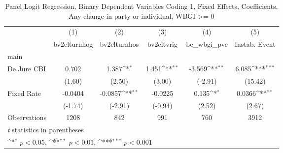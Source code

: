 \begin{table}[htbp]\centering
\def\sym#1{\ifmmode^{#1}\else\(^{#1}\)\fi}
\caption{Panel Logit Regression, Binary Dependent Variables Coding 1, Fixed Effects, Coefficients, Any change in party or individual, WBGI >= 0 \label{logitFEMultIndDJ}}
\begin{tabular}{l*{5}{c}}
\toprule
                                        &\multicolumn{1}{c}{(1)}&\multicolumn{1}{c}{(2)}&\multicolumn{1}{c}{(3)}&\multicolumn{1}{c}{(4)}&\multicolumn{1}{c}{(5)}\\
                                        &\multicolumn{1}{c}{bv2elturnhog}&\multicolumn{1}{c}{bv2elturnhos}&\multicolumn{1}{c}{bv2eltvrig}&\multicolumn{1}{c}{be\_wbgi\_pve}&\multicolumn{1}{c}{Instab. Event}\\
\midrule
main                                    &                  &                  &                  &                  &                  \\
De Jure CBI                             &    0.702         &    1.387\sym{*}  &    1.451\sym{**} &   -3.569\sym{**} &    6.085\sym{***}\\
                                        &   (1.60)         &   (2.50)         &   (3.00)         &  (-2.91)         &  (15.42)         \\
\addlinespace
Fixed Rate                              &  -0.0404         &  -0.0857\sym{**} &  -0.0225         &    0.135\sym{*}  &   0.0366\sym{**} \\
                                        &  (-1.74)         &  (-2.91)         &  (-0.94)         &   (2.52)         &   (2.67)         \\
\midrule
Observations                            &     1208         &      842         &      991         &      760         &     3912         \\
\bottomrule
\multicolumn{6}{l}{\footnotesize \textit{t} statistics in parentheses}\\
\multicolumn{6}{l}{\footnotesize \sym{*} \(p<0.05\), \sym{**} \(p<0.01\), \sym{***} \(p<0.001\)}\\
\end{tabular}
\end{table}
